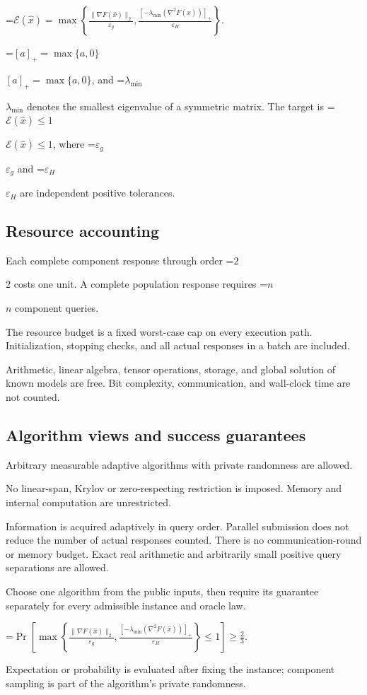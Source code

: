 \documentclass[10pt,a4paper]{article}
\newcommand{\AtlasMath}[1]{\par\begingroup\centering\setbox0=\hbox{$\displaystyle #1$}\ifdim\wd0>1.4\linewidth\typeout{ATLAS WIDE FORMULA: \the\wd0}\fi\ifdim\wd0>\linewidth\resizebox{\linewidth}{!}{\box0}\else\box0\fi\par\endgroup}
\newcommand{\AtlasInlineMath}[1]{\begingroup\setbox0=\hbox{$#1$}\ifdim\wd0>.4\linewidth\endgroup\AtlasMath{#1}\else\endgroup$#1$\fi}
\begin{document}
\AtlasMath{\mathcal{E}(\widehat{x})=\max\left\{\frac{\|\nabla F(\widehat{x})\|_2}{\varepsilon_g},\frac{[-\lambda_{\min}(\nabla^2F(\widehat{x}))]_+}{\varepsilon_H}\right\}.}


\AtlasInlineMath{[a]_+=\max\{a,0\}}, and \AtlasInlineMath{\lambda_{\min}} denotes the smallest eigenvalue of a symmetric matrix. The target is \AtlasInlineMath{\mathcal{E}(\widehat{x})\le1}, where \AtlasInlineMath{\varepsilon_g} and \AtlasInlineMath{\varepsilon_H} are independent positive tolerances.

\subsection{Resource accounting}
Each complete component response through order \AtlasInlineMath{2} costs one unit. A complete population response requires \AtlasInlineMath{n} component queries.

The resource budget is a fixed worst-case cap on every execution path. Initialization, stopping checks, and all actual responses in a batch are included.

Arithmetic, linear algebra, tensor operations, storage, and global solution of known models are free. Bit complexity, communication, and wall-clock time are not counted.

\subsection{Algorithm views and success guarantees}
Arbitrary measurable adaptive algorithms with private randomness are allowed.

No linear-span, Krylov or zero-respecting restriction is imposed. Memory and internal computation are unrestricted.

Information is acquired adaptively in query order. Parallel submission does not reduce the number of actual responses counted. There is no communication-round or memory budget. Exact real arithmetic and arbitrarily small positive query separations are allowed.

Choose one algorithm from the public inputs, then require its guarantee separately for every admissible instance and oracle law.


\AtlasMath{\Pr\!\left[\max\left\{\frac{\|\nabla F(\widehat{x})\|_2}{\varepsilon_g},\frac{[-\lambda_{\min}(\nabla^2F(\widehat{x}))]_+}{\varepsilon_H}\right\}\le 1\right]\ge\frac23.}


Expectation or probability is evaluated after fixing the instance; component sampling is part of the algorithm's private randomness.
\end{document}
